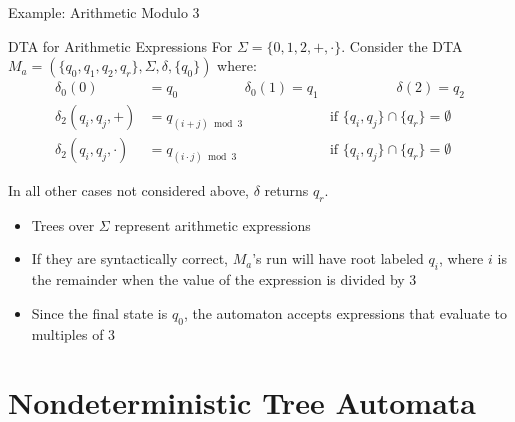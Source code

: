 \documentclass[10pt,svgnames,fragile]{beamer}
\begin{document}
\begin{frame}{Example: Arithmetic Modulo 3}
  \begin{block}{DTA for Arithmetic Expressions}
    For $\Sigma = \{0, 1, 2, +, \cdot\}$. Consider the DTA $M_a = (\{q_0, q_1, q_2, q_r\}, \Sigma, \delta, \{q_0\})$ where:
    \begin{align*}
      \delta_0(0) &= q_0  \hspace{2cm} \delta_0(1) = q_1 & \hspace{2cm} \delta(2) = q_2 \\
      \delta_2(q_i, q_j, +) &= q_{(i+j) \bmod 3} & \text{if } \{q_i, q_j\} \cap \{q_r\} = \emptyset \\
      \delta_2(q_i, q_j, \cdot) &= q_{(i \cdot j) \bmod 3} & \text{if } \{q_i, q_j\} \cap \{q_r\} = \emptyset
    \end{align*}
    
    In all other cases not considered above, $\delta$ returns $q_r$.
  \end{block}
  
  \begin{itemize}
    \item Trees over $\Sigma$ represent arithmetic expressions
    \item If they are syntactically correct, $M_a$'s run will have root labeled $q_i$, where $i$ is the remainder when the value of the expression is divided by 3
    \item Since the final state is $q_0$, the automaton accepts expressions that evaluate to multiples of 3
  \end{itemize}
\end{frame}

\section{Nondeterministic Tree Automata}
\end{document}
